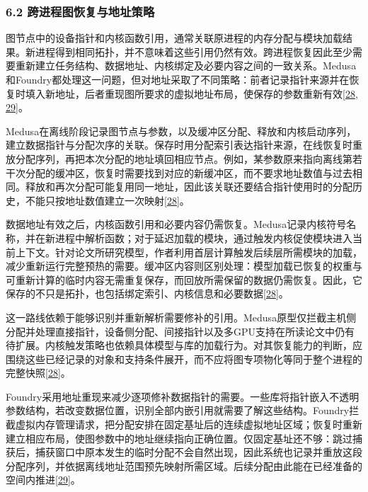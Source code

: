 \documentclass[UTF8,11pt,fontset=windows]{ctexart}
\begin{document}
\hypertarget{section-6-2}{%
\subsubsection{6.2 跨进程图恢复与地址策略}\label{section-6-2}}

图节点中的设备指针和内核函数引用，通常关联原进程的内存分配与模块加载结果。新进程得到相同拓扑，并不意味着这些引用仍然有效。跨进程恢复因此至少需要重新建立任务结构、数据地址、内核绑定及必要内容之间的一致关系。Medusa和Foundry都处理这一问题，但对地址采取了不同策略：前者记录指针来源并在恢复时填入新地址，后者重现图所要求的虚拟地址布局，使保存的参数重新有效\protect\hyperlink{ref-28}{{[}28}, \protect\hyperlink{ref-29}{29{]}}。

Medusa在离线阶段记录图节点与参数，以及缓冲区分配、释放和内核启动序列，建立数据指针与分配次序的关联。保存时用分配索引表达指针来源，在线恢复时重放分配序列，再把本次分配的地址填回相应节点。例如，某参数原来指向离线第若干次分配的缓冲区，恢复时需要找到对应的新缓冲区，而不要求地址数值与过去相同。释放和再次分配可能复用同一地址，因此该关联还要结合指针使用时的分配历史，不能只按地址数值建立一次映射\protect\hyperlink{ref-28}{{[}28{]}}。

数据地址有效之后，内核函数引用和必要内容仍需恢复。Medusa记录内核符号名称，并在新进程中解析函数；对于延迟加载的模块，通过触发内核促使模块进入当前上下文。针对论文所研究模型，作者利用首层计算触发后续层所需模块的加载，减少重新运行完整预热的需要。缓冲区内容则区别处理：模型加载已恢复的权重与可重新计算的临时内容无需重复保存，而回放所需保留的数据仍需恢复。因此，它保存的不只是拓扑，也包括绑定索引、内核信息和必要数据\protect\hyperlink{ref-28}{{[}28{]}}。

这一路线依赖于能够识别并重新解析需要修补的引用。Medusa原型仅拦截主机侧分配并处理直接指针，设备侧分配、间接指针以及多GPU支持在所读论文中仍有待扩展。内核触发策略也依赖具体模型与库的加载行为。对其恢复能力的判断，应围绕这些已经记录的对象和支持条件展开，而不应将图专项物化等同于整个进程的完整快照\protect\hyperlink{ref-28}{{[}28{]}}。

Foundry采用地址重现来减少逐项修补数据指针的需要。一些库将指针嵌入不透明参数结构，若改变数据位置，识别全部内嵌引用就需要了解这些结构。Foundry拦截虚拟内存管理请求，把分配安排在固定基址后的连续虚拟地址区域；恢复时重新建立相应布局，使图参数中的地址继续指向正确位置。仅固定基址还不够：跳过捕获后，捕获窗口中原本发生的临时分配不会自然出现，因此系统也记录并重放这段分配序列，并依据离线地址范围预先映射所需区域。后续分配由此能在已经准备的空间内推进\protect\hyperlink{ref-29}{{[}29{]}}。
\end{document}
